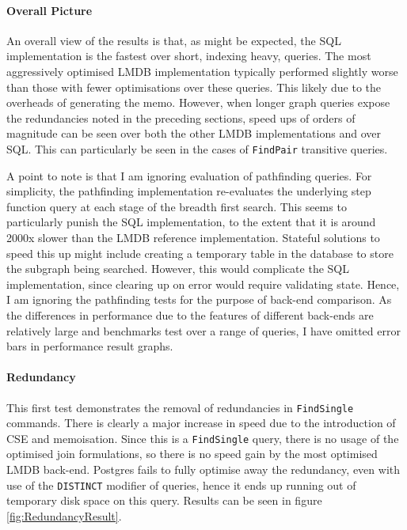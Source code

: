 \documentclass[12pt,a4paper,twoside,openright]{report}
\newcommand\codeName[1]{\texttt{#1}}
\let\oldparagraph\paragraph
\renewcommand{\paragraph}[1]{\oldparagraph{#1}\mbox{}}
\begin{document}
		\paragraph{Overall Picture}
		An overall view of the results is that, as might be expected, the SQL implementation is the fastest over short, indexing heavy, queries. The most aggressively optimised LMDB implementation typically performed slightly worse than those with fewer optimisations over these queries. This likely due to the overheads of generating the memo. However, when longer graph queries expose the redundancies noted in the preceding sections, speed ups of orders of magnitude can be seen over both the other LMDB implementations and over SQL. This can particularly be seen in the cases of \codeName{FindPair} transitive queries.

		A point to note is that I am ignoring evaluation of pathfinding queries. For simplicity, the pathfinding implementation re-evaluates the underlying step function query at each stage of the breadth first search. This seems to particularly punish the SQL implementation, to the extent that it is around 2000x slower than the LMDB reference implementation. Stateful solutions to speed this up might include creating a temporary table in the database to store the subgraph being searched. However, this would complicate the SQL implementation, since clearing up on error would require validating state. Hence, I am ignoring the pathfinding tests for the purpose of back-end comparison.
		As the differences in performance due to the features of different back-ends are relatively large and benchmarks test over a range of queries, I have omitted error bars in performance result graphs.


\paragraph{Redundancy}
This first test demonstrates the removal of redundancies in \codeName{FindSingle} commands. There is clearly a major increase in speed due to the introduction of CSE and memoisation. Since this is a \codeName{FindSingle} query, there is no usage of the optimised join formulations, so there is no speed gain by the most optimised LMDB back-end. Postgres fails to fully optimise away the redundancy, even with use of the \texttt{DISTINCT} modifier of queries, hence it ends up running out of temporary disk space on this query. Results can be seen in figure \ref{fig:RedundancyResult}.
				
\end{document}

